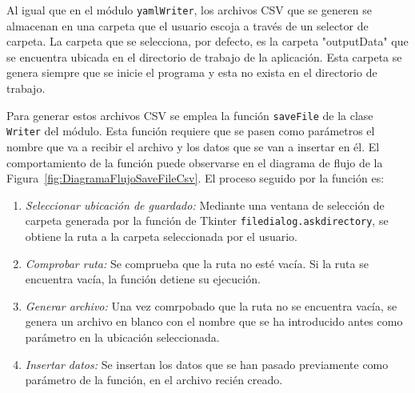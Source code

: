Al igual que en el módulo \texttt{yamlWriter}, los archivos \acrshort{CSV} que se generen se almacenan en una carpeta que el usuario escoja a través de un selector de carpeta. La carpeta que se selecciona, por defecto, es la carpeta "outputData" que se encuentra ubicada en el directorio de trabajo de la aplicación. Esta carpeta se genera siempre que se inicie el programa y esta no exista en el directorio de trabajo.


Para generar estos archivos \acrshort{CSV} se emplea la función \texttt{saveFile} de la clase \texttt{Writer} del módulo. Esta función requiere que se pasen como parámetros el nombre que va a recibir el archivo y los datos que se van a insertar en él. El comportamiento de la función puede observarse en el diagrama de flujo de la Figura~\ref{fig:DiagramaFlujoSaveFileCsv}. El proceso seguido por la función es:
\begin{enumerate}
    \item \textit{Seleccionar ubicación de guardado:} Mediante una ventana de selección de carpeta generada por la función de Tkinter \texttt{filedialog.askdirectory}, se obtiene la ruta a la carpeta seleccionada por el usuario.
    \item \textit{Comprobar ruta:} Se comprueba que la ruta no esté vacía. Si la ruta se encuentra vacía, la función detiene su ejecución.
    \item \textit{Generar archivo:} Una vez comrpobado que la ruta no se encuentra vacía, se genera un archivo en blanco con el nombre que se ha introducido antes como parámetro en la ubicación seleccionada.
    \item \textit{Insertar datos:} Se insertan los datos que se han pasado previamente como parámetro de la función, en el archivo recién creado.
\end{enumerate}

